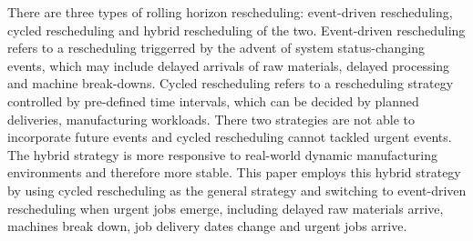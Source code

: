 There are three types of rolling horizon rescheduling: event-driven rescheduling, cycled rescheduling and hybrid rescheduling of the two.
Event-driven rescheduling refers to a rescheduling triggerred by the advent of system status-changing events, which may include delayed arrivals of raw materials, delayed processing and machine break-downs.
Cycled rescheduling refers to a rescheduling strategy controlled by pre-defined time intervals, which can be decided by planned deliveries, manufacturing workloads.
There two strategies are not able to incorporate future events and cycled rescheduling cannot tackled urgent events\citep{jian19972}.
The hybrid strategy is more responsive to real-world dynamic manufacturing environments and therefore more stable.
This paper employs this hybrid strategy by using cycled rescheduling as the general strategy and switching to event-driven rescheduling when urgent jobs emerge, including delayed raw materials arrive, machines break down, job delivery dates change and urgent jobs arrive.